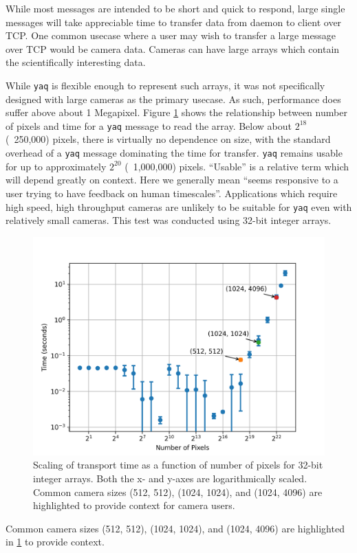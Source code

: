 \documentclass[11pt, full]{article}
\newcommand\yaq{\texttt{yaq}}
\begin{document}
While most messages are intended to be short and quick to respond, large single messages will take appreciable time to transfer data from daemon to client over TCP.
One common usecase where a user may wish to transfer a large message over TCP would be camera data.
Cameras can have large arrays which contain the scientifically interesting data.

While \yaq{} is flexible enough to represent such arrays, it was not specifically designed with large cameras as the primary usecase.
As such, performance does suffer above about 1 Megapixel.
Figure \ref{si:fig:scaling} shows the relationship between number of pixels and time for a \yaq{} message to read the array.
Below about $2^{18}$ (~250,000) pixels, there is virtually no dependence on size, with the standard overhead of a \yaq{} message dominating the time for transfer.
\yaq{} remains usable for up to approximately $2^{20}$ (~1,000,000) pixels.
``Usable'' is a relative term which will depend greatly on context.
Here we generally mean ``seems responsive to a user trying to have feedback on human timescales''.
Applications which require high speed, high throughput cameras are unlikely to be suitable for \yaq{} even with relatively small cameras.
This test was conducted using 32-bit integer arrays.

\begin{figure}
  \includegraphics[width=.75\columnwidth]{figures/scaling/scaling}
	\caption{\label{si:fig:scaling} Scaling of transport time as a function of number of pixels for 32-bit integer arrays. Both the x- and y-axes are logarithmically scaled. Common camera sizes (512, 512), (1024, 1024), and (1024, 4096) are highlighted to provide context for camera users.}
\end{figure}

Common camera sizes (512, 512), (1024, 1024), and (1024, 4096) are highlighted in \ref{si:fig:scaling} to provide context.
\end{document}
